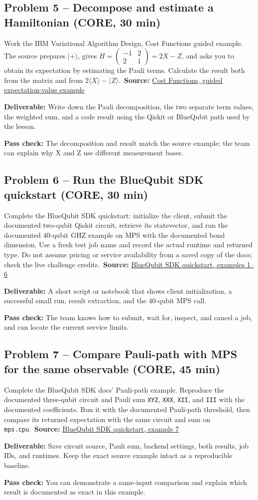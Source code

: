 \documentclass[11pt,letterpaper]{article}
\newcommand{\taskbox}[1]{\vspace{2pt}\noindent\colorbox{pale}{\parbox{\dimexpr\linewidth-2\fboxsep}{\textcolor{ink}{\textbf{Deliverable:} #1}}}\vspace{3pt}}
\newcommand{\pass}[1]{\textbf{Pass check:} #1}
\newcommand{\source}[2]{\textbf{Source:} \href{#1}{#2}}
\begin{document}
\subsection*{Problem 5 -- Decompose and estimate a Hamiltonian (CORE, 30 min)}
Work the IBM Variational Algorithm Design, Cost Functions guided example. The source prepares \(|+\rangle\), gives \(H=\begin{pmatrix}-1&2\\2&1\end{pmatrix}=2X-Z\), and asks you to obtain its expectation by estimating the Pauli terms. Calculate the result both from the matrix and from \(2\langle X\rangle-\langle Z\rangle\).\
\source{https://learning.quantum.ibm.com/course/variational-algorithm-design/cost-functions}{Cost Functions, guided expectation-value example}
\taskbox{Write down the Pauli decomposition, the two separate term values, the weighted sum, and a code result using the Qiskit or BlueQubit path used by the lesson.}
\pass{The decomposition and result match the source example; the team can explain why X and Z use different measurement bases.}

\subsection*{Problem 6 -- Run the BlueQubit SDK quickstart (CORE, 30 min)}
Complete the BlueQubit SDK quickstart: initialize the client, submit the documented two-qubit Qiskit circuit, retrieve its statevector, and run the documented 40-qubit GHZ example on MPS with the documented bond dimension. Use a fresh test job name and record the actual runtime and returned type. Do not assume pricing or service availability from a saved copy of the docs; check the live challenge credits.\
\source{https://app.bluequbit.io/sdk-docs/index.html}{BlueQubit SDK quickstart, examples 1--6}
\taskbox{A short script or notebook that shows client initialization, a successful small run, result extraction, and the 40-qubit MPS call.}
\pass{The team knows how to submit, wait for, inspect, and cancel a job, and can locate the current service limits.}

\subsection*{Problem 7 -- Compare Pauli-path with MPS for the same observable (CORE, 45 min)}
Complete the BlueQubit SDK docs' Pauli-path example. Reproduce the documented three-qubit circuit and Pauli sum \texttt{XYZ}, \texttt{XXX}, \texttt{XII}, and \texttt{III} with the documented coefficients. Run it with the documented Pauli-path threshold, then compare its returned expectation with the same circuit and sum on \texttt{mps.cpu}.\
\source{https://app.bluequbit.io/sdk-docs/index.html}{BlueQubit SDK quickstart, example 7}
\taskbox{Save circuit source, Pauli sum, backend settings, both results, job IDs, and runtimes. Keep the exact source example intact as a reproducible baseline.}
\pass{You can demonstrate a same-input comparison and explain which result is documented as exact in this example.}
\end{document}
